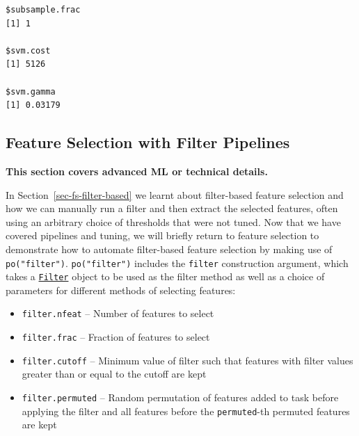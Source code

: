 \begin{verbatim}
$subsample.frac
[1] 1

$svm.cost
[1] 5126

$svm.gamma
[1] 0.03179
\end{verbatim}

\hypertarget{sec-pipelines-featsel}{%
\subsection{Feature Selection with Filter
Pipelines}\label{sec-pipelines-featsel}}

\begin{tcolorbox}[enhanced jigsaw, colframe=quarto-callout-note-color-frame, rightrule=.15mm, bottomrule=.15mm, toprule=.15mm, opacityback=0, colback=white, left=2mm, arc=.35mm, breakable, leftrule=.75mm]
\begin{minipage}[t]{5.5mm}
\textcolor{quarto-callout-note-color}{\faInfo}
\end{minipage}%
\begin{minipage}[t]{\textwidth - 5.5mm}

\textbf{This section covers advanced ML or technical
details.}\vspace{2mm}

\end{minipage}%
\end{tcolorbox}

In Section~\ref{sec-fs-filter-based} we learnt about filter-based
feature selection and how we can manually run a
filter and then extract the selected features, often using an arbitrary
choice of thresholds that were not tuned. Now that we have covered
pipelines and tuning, we will briefly return to feature selection to
demonstrate how to automate filter-based feature selection by making use
of \texttt{po("filter")}. \texttt{po("filter")} includes the
\texttt{filter} construction argument, which takes a
\href{https://www.rdocumentation.org/packages/base/topics/funprog}{\texttt{Filter}}
object to be used as the filter method as well as a choice of parameters
for different methods of selecting features:

\begin{itemize}
\tightlist
\item
  \texttt{filter.nfeat} -- Number of features to select
\item
  \texttt{filter.frac} -- Fraction of features to select
\item
  \texttt{filter.cutoff} -- Minimum value of filter such that features
  with filter values greater than or equal to the cutoff are kept
\item
  \texttt{filter.permuted} -- Random permutation of features added to
  task before applying the filter and all features before the
  \texttt{permuted}-th permuted features are kept
\end{itemize}

